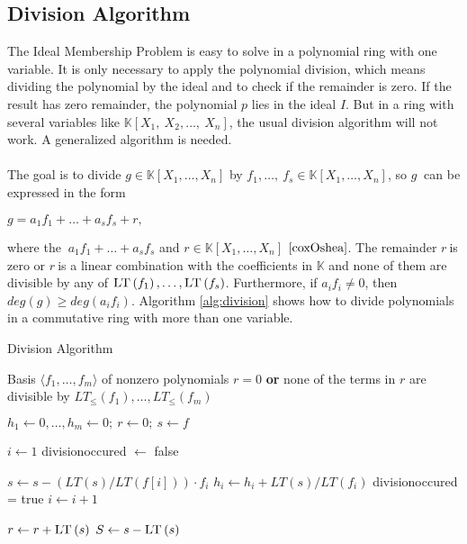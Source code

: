 \newpage


\subsection{Division Algorithm}
\label{subsec:division}

The Ideal Membership Problem is easy to solve in a polynomial ring with one variable. It is only necessary to apply the polynomial division, which means dividing the polynomial by the ideal and to check if the remainder is zero. 
If the result has zero remainder, the polynomial $p$ lies in the ideal $I$.
But in a ring with several variables like $ \mathbb{K} \left[X_{1},~X_{2},\dots,~X_{n}\right]$, the usual division algorithm will not work. A generalized algorithm is needed.\\ \\
The goal is to divide $g \in \mathbb{K}\left[X_{1}, \dots, X_{n}\right] $ by 
$f_{1},\dots,~ f_{s} \in \mathbb{K}\left[X_{1}, \dots, X_{n}\right]$, so $g~$ can be expressed in the form \begin{center}
$g = a_{1}f_{1}+ \ldots + a_{s}f_{s} +r,$
\end{center} 
where the $~a_{1}f_{1}+ \ldots + a_{s}f_{s} $ and $r \in \mathbb{K}\left[X_{1}, \dots, X_{n}\right]$ $\cite{coxOshea}$.
The remainder $r~$is zero or $r~$is a linear combination with the coefficients in $\mathbb{K}$ and none of them are divisible by any of
$\textsc{LT}\left(f_{1} \right), \ldots, \textsc{LT}\left(f_{s} \right)  $.
Furthermore, if $a_{i}f_{i} \neq 0 $, then
$deg(g) \geq deg(a_{i}f_{i})$. Algorithm \ref{alg:division} shows how to divide polynomials in a commutative ring with more than one variable.

\newpage


\begin{algorithm}
\caption{Division Algorithm \cite{KHZ}}
\label{alg:division}
\begin{algorithmic}[1]

\Require Basis $\langle f_{1}, \dots, f_{m}\rangle$ of nonzero polynomials  
\Ensure $r=0$ \textbf{or} none of the terms in $r$ are divisible by $ LT_{\leq}\left( f_{1}\right) , \dots , LT_{\leq} \left( f_{m}\right) $

\State $ h_{1} \gets 0 ,\dots ,h_{m} \gets 0;~r \gets 0;~s \gets f  $

\State $ i \gets 1 $
\State  division\textunderscore occured $ \gets $  false 

\State $ s \gets s - ( LT \left( s\right)/ LT \left( f \left[ i\right] \right))  \cdot f_{i} $
\State $h_{i} \gets h_{i} + LT\left( s\right) / LT\left( f_{i}\right) $
\State division\textunderscore occured = true
\Else
\State $i \gets i+1$
\EndIf
\EndWhile

\State $ r \gets r + \textsc{LT}\left( s\right) $
\State $ S \gets s - \textsc{LT}\left( s\right) $
\EndIf

\EndWhile


\end{algorithmic}
\end{algorithm}


